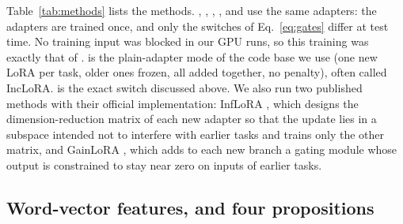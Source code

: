 Table~\ref{tab:methods} lists the methods. \plain{}, \keyswitch{}, \centre{}, \nearest{}, \cert{} and
\exactfirst{} use the same adapters: the adapters are trained once, and only the switches of
Eq.~\eqref{eq:gates} differ at test time. No training input was blocked in our GPU runs, so this
training was exactly that of \plain{}. \plain{} is the plain-adapter mode of the code base we
use (one new LoRA per task, older ones frozen, all added together, no penalty), often called
IncLoRA. \keyswitch{} is the exact switch discussed above. We also run two published methods with
their official implementation: InfLoRA \citep{liang2024inflora}, which designs the
dimension-reduction matrix of each new adapter so that the update lies in a subspace intended not
to interfere with earlier tasks and trains only the other matrix, and GainLoRA
\citep{liang2025gainlora}, which adds to each new branch a gating module whose output is
constrained to stay near zero on inputs of earlier tasks.

\subsection{Word-vector features, and four propositions}
\label{app:features}


